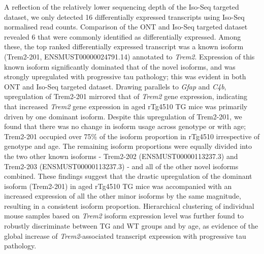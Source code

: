 A reflection of the relatively lower sequencing depth of the Iso-Seq targeted dataset, we only detected 16 differentially expressed transcripts using Iso-Seq normalised read counts. Comparison of the ONT and Iso-Seq targeted dataset revealed 6 that were commonly identified as differentially expressed. Among these, the top ranked differentially expressed transcript was a known isoform (Trem2-201, ENSMUST00000024791.14) annotated to \textit{Trem2}. Expression of this known isoform significantly dominated that of the novel isoforms, and was strongly upregulated with progressive tau pathology; this was evident in both ONT and Iso-Seq targeted dataset. Drawing parallels to \textit{Gfap} and \textit{C4b}, upregulation of Trem2-201 mirrored that of \textit{Trem2} gene expression, indicating that increased \textit{Trem2} gene expression in aged rTg4510 TG mice was primarily driven by one dominant isoform. Despite this upregulation of Trem2-201, we found that there was no change in isoform usage across genotype or with age; Trem2-201 occupied over 75\% of the isoform proportion in rTg4510 irrespective of genotype and age. The remaining isoform proportions were equally divided into the two other known isoforms - Trem2-202 (ENSMUST00000113237.3) and Trem2-203 (ENSMUST00000113237.3) - and all of the other novel isoforms combined. These findings suggest that the drastic upregulation of the dominant isoform (Trem2-201) in aged rTg4510 TG mice was accompanied with an increased expression of all the other minor isoforms by the same magnitude, resulting in a consistent isoform proportion. Hierarchical clustering of individual mouse samples based on \textit{Trem2} isoform expression level was further found to robustly discriminate between TG and WT groups and by age, as evidence of the global increase of \textit{Trem2}-associated transcript expression with progressive tau pathology.  

